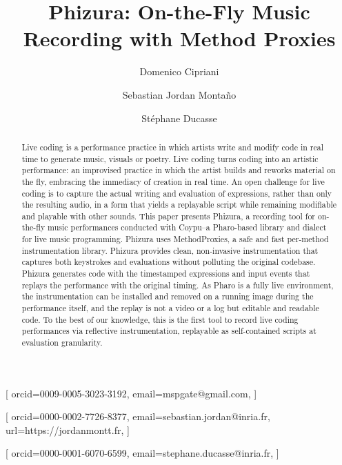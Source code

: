 \documentclass[
]{ceurart}
\begin{document}


\title{Phizura: On-the-Fly Music Recording with Method Proxies}



\author[1]{Domenico Cipriani}[%
orcid=0009-0005-3023-3192,
email=mspgate@gmail.com,
]


\author[1]{Sebastian {Jordan Montaño}}[%
orcid=0000-0002-7726-8377,
email=sebastian.jordan@inria.fr,
url=https://jordanmontt.fr,
]

\author[1]{Stéphane Ducasse}[
orcid=0000-0001-6070-6599,
email=stephane.ducasse@inria.fr,
]

\address[1]{Univ. Lille, Inria, CNRS, Centrale Lille, UMR 9189 CRIStAL, Park Plaza, Parc scientifique de la Haute-Borne, 40 Av. Halley Bât A, 59650 Villeneuve-d’Ascq, France}


\begin{abstract}
Live coding is a performance practice in which artists write and modify code in real time to generate music, visuals or poetry.
Live coding turns coding into an artistic performance: an improvised practice in which the artist builds and reworks material on the fly, embracing the immediacy of creation in real time.
An open challenge for live coding is to capture the actual writing and evaluation of expressions, rather than only the resulting audio, in a form that yields a replayable script while remaining modifiable and playable with other sounds.
This paper presents Phizura, a recording tool for on-the-fly music performances conducted with Coypu--a Pharo-based library and dialect for live music programming.
Phizura uses MethodProxies, a safe and fast per-method instrumentation library.
Phizura provides clean, non-invasive instrumentation that captures both keystrokes and evaluations without polluting the original codebase.
Phizura generates code with the timestamped expressions and input events that replays the performance with the original timing.
As Pharo is a fully live environment, the instrumentation can be installed and removed on a running image during the performance itself, and the replay is not a video or a log but editable and readable code.
To the best of our knowledge, this is the first tool to record live coding performances via reflective instrumentation, replayable as self-contained scripts at evaluation granularity.
\end{abstract}
\end{document}
